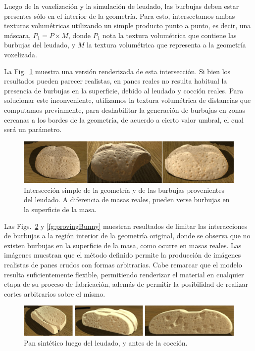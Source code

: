Luego de la voxelización y la simulación de leudado, las burbujas deben estar presentes sólo en el interior de la geometría.
Para esto, intersectamos ambas texturas volumétricas utilizando un simple producto punto a punto, es decir, una máscara, $P_{1} = P \times M$, donde $P_{1}$ nota la textura volumétrica que contiene las burbujas del leudado, y $M$ la textura volumétrica que representa a la geometría voxelizada.

La Fig.~\ref{fg:intersectProblem} muestra una versión renderizada de esta intersección.
Si bien los resultados pueden parecer realistas, en panes reales no resulta habitual la presencia de burbujas en la superficie, debido al leudado y cocción reales.
Para solucionar este inconveniente, utilizamos la textura volumétrica de distancias que computamos previamente, para deshabilitar la generación de burbujas en zonas cercanas a los bordes de la geometría, de acuerdo a cierto valor umbral, el cual será un parámetro.


\begin{figure}
\includegraphics[width=12cm]{figures/intersectProblem}
\caption[Intersección simple de la geometría y de las burbujas provenientes del leudado]{Intersección simple de la geometría y de las burbujas provenientes del leudado. A diferencia de masas reales, pueden verse burbujas en la superficie de la masa.}
\label{fg:intersectProblem}
\end{figure}


Las Figs.~\ref{fg:proving} y \ref{fg:provingBunny} muestran resultados de limitar las interacciones de burbujas a la región interior de la geometría original, donde se observa que no existen burbujas en la superficie de la masa, como ocurre en masas reales.
Las imágenes muestran que el método definido permite la producción de imágenes realistas de panes crudos con formas arbitrarias.
Cabe remarcar que el modelo resulta suficientemente flexible, permitiendo renderizar el material en cualquier etapa de su proceso de fabricación, además de permitir la posibilidad de realizar cortes arbitrarios sobre el mismo.

\begin{figure}
\includegraphics[width=12cm]{figures/prebakebread}
\caption{Pan sintético luego del leudado, y antes de la cocción.}
\label{fg:proving}
\end{figure}

